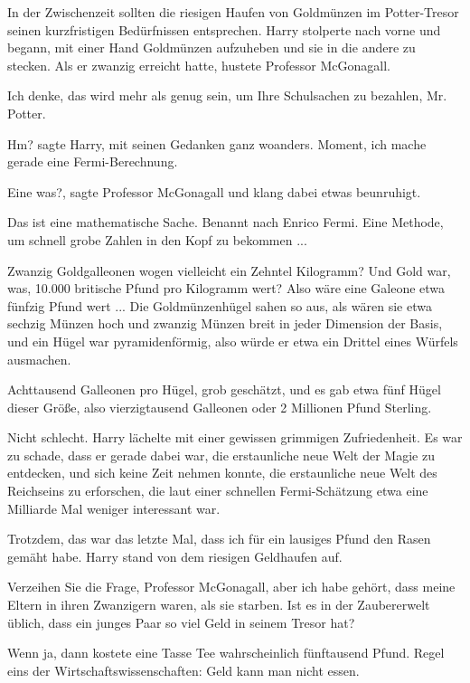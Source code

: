 In der Zwischenzeit sollten die riesigen Haufen von Goldmünzen im Potter-Tresor
seinen kurzfristigen Bedürfnissen entsprechen. Harry stolperte nach vorne und
begann, mit einer Hand Goldmünzen aufzuheben und sie in die andere zu stecken.
Als er zwanzig erreicht hatte, hustete Professor McGonagall.

\glqq{}Ich denke, das wird mehr als genug sein, um Ihre Schulsachen zu bezahlen,
Mr. Potter.\grqq{}

\glqq{}Hm?\grqq{} sagte Harry, mit seinen Gedanken ganz woanders. \glqq{}Moment,
ich mache gerade eine Fermi-Berechnung.\grqq{}

\glqq{}Eine was?\grqq{}, sagte Professor McGonagall und klang dabei etwas
beunruhigt.

\glqq{}Das ist eine mathematische Sache. Benannt nach Enrico Fermi. Eine Methode,
um schnell grobe Zahlen in den Kopf zu bekommen ...\grqq{}

Zwanzig Goldgalleonen wogen vielleicht ein Zehntel Kilogramm? Und Gold war, was,
10.000 britische Pfund pro Kilogramm wert? Also wäre eine Galeone etwa fünfzig
Pfund wert ... Die Goldmünzenhügel sahen so aus, als wären sie etwa sechzig
Münzen hoch und zwanzig Münzen breit in jeder Dimension der Basis, und ein Hügel
war pyramidenförmig, also würde er etwa ein Drittel eines Würfels ausmachen.

Achttausend Galleonen pro Hügel, grob geschätzt, und es gab etwa fünf Hügel
dieser Größe, also vierzigtausend Galleonen oder 2 Millionen Pfund Sterling.

Nicht schlecht. Harry lächelte mit einer gewissen grimmigen Zufriedenheit. Es
war zu schade, dass er gerade dabei war, die erstaunliche neue Welt der Magie zu
entdecken, und sich keine Zeit nehmen konnte, die erstaunliche neue Welt des
Reichseins zu erforschen, die laut einer schnellen Fermi-Schätzung etwa eine
Milliarde Mal weniger interessant war.

Trotzdem, das war das letzte Mal, dass ich für ein lausiges Pfund den Rasen
gemäht habe. Harry stand von dem riesigen Geldhaufen auf.

\glqq{}Verzeihen Sie die Frage, Professor McGonagall, aber ich habe gehört, dass
meine Eltern in ihren Zwanzigern waren, als sie starben. Ist es in der
Zaubererwelt üblich, dass ein junges Paar so viel Geld in seinem Tresor
hat?\grqq{}

Wenn ja, dann kostete eine Tasse Tee wahrscheinlich fünftausend Pfund. Regel
eins der Wirtschaftswissenschaften: Geld kann man nicht essen.

